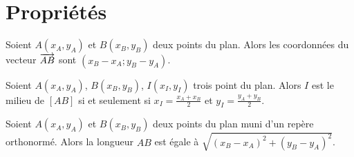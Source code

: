 \section{Propriétés}

\begin{propriete}
  Soient $A(x_A,y_A)$ et $B(x_B,y_B)$ deux points du plan. Alors les coordonnées du vecteur $\overrightarrow{AB}$ sont $(x_B-x_A;y_B-y_A)$.
\end{propriete}

\begin{propriete}
  Soient $A(x_A,y_A)$, $B(x_B,y_B)$, $I(x_I,y_I)$ trois point du plan. Alors $I$ est le milieu de $[AB]$ si et seulement si $x_I=\frac{x_A+x_B}{2}$ et $y_I=\frac{y_A+y_B}{2}$.
\end{propriete}

\begin{propriete}
  Soient $A(x_A,y_A)$ et $B(x_B,y_B)$ deux points du plan muni d'un repère orthonormé. Alors la longueur $AB$ est égale à $\sqrt{\left(x_B-x_A\right)^2+\left(y_B-y_A\right)^2}$.
\end{propriete}
